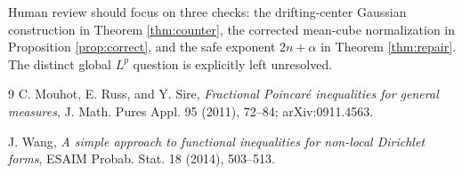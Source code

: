 \documentclass[11pt]{article}
\begin{document}
Human review should focus on three checks: the drifting-center Gaussian
construction in Theorem \ref{thm:counter}, the corrected mean-cube
normalization in Proposition \ref{prop:correct}, and the safe exponent
$2n+\alpha$ in Theorem \ref{thm:repair}.  The distinct global $L^p$ question
is explicitly left unresolved.

\begin{thebibliography}{9}
C. Mouhot, E. Russ, and Y. Sire,
\emph{Fractional Poincar\'e inequalities for general measures},
J. Math. Pures Appl. 95 (2011), 72--84; arXiv:0911.4563.

J. Wang,
\emph{A simple approach to functional inequalities for non-local Dirichlet
forms}, ESAIM Probab. Stat. 18 (2014), 503--513.
\end{thebibliography}
\end{document}
